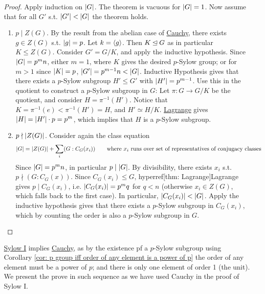 \begin{proof}
    Apply induction on $\left|G\right|$. The theorem is vacuous for $\left|G\right| = 1$. Now assume that for all $G'$ s.t. $\left|G'\right| < \left|G\right|$ the theorem holds. 

    \begin{enumerate}
        \item[\bu{Case 1.}] $p \mid Z(G)$. By the result from the abelian case of \hyperref[thm: Cauchy]{Cauchy}, there exists $g \in Z(G)$ s.t. $\left|g\right| = p$. Let $k = \left\langle g \right\rangle$. Then $K \unlhd G$ as in particular $K \leq Z(G)$. Consider $G' = G/K$, and apply the inductive hypothesis. Since $\left|G\right| = p^m n$, either $m = 1$, where $K$ gives the desired $p$-Sylow group; or for $m > 1$ since $\left|K\right| = p$, $\left|G'\right| = p^{m-1}n < \left|G\right|$. Inductive Hypothesis gives that there exists a $p$-Sylow subgroup $H' \leq G'$ with $\left|H'\right| = p^{m-1}$. Use this in the quotient to construct a $p$-Sylow subgroup in $G$: Let $\pi: G \to G/K$ be the quotient, and consider $H = \pi^{-1}(H')$. Notice that $K = \pi^{-1}(e) < \pi^{-1}(H') = H$, and $H' \simeq H/K$. \hyperref[thm: Lagrange]{Lagrange} gives $\left|H\right| = \left|H'\right| \cdot p = p^m$, which implies that $H$ is a $p$-Sylow subgroup.

        \item[\bu{Case 2.}]$p \nmid \left|Z(G)\right|$. Consider again the class equation
        \[
            \left|G\right| = \left|Z(G)\right| + \sum_{i}(G : C_G(x_i)) \qquad \text{where $x_i$ runs over set of representatives of conjugacy classes}
        \]
        Since $\left|G\right| = p^m n$, in particular $p \mid \left|G\right|$. By divisibility, there exists $x_i$ s.t. $p \nmid (G: C_G(x))$. Since $C_G(x_i) \leq G$, hyperref[thm: Lagrange]{Lagrange} gives $p \mid C_G(x_i)$, i.e. $\left|C_G(x_i)\right| = p^m q$ for $q < n$ (otherwise $x_i \in Z(G)$, which falls back to the first case). In particular, $\left|C_G(x_i)\right| < \left|G\right|$. Apply the inductive hypothesis gives that there exists a $p$-Sylow subgroup in $C_G(x_i)$, which by counting the order is also a $p$-Sylow subgroup in $G$.
    \end{enumerate}
\end{proof}

\begin{remark}
    \hyperref[thm: Sylow I]{Sylow I} implies \hyperref[thm: Cauchy]{Cauchy}, as by the existence pf a $p$-Sylow subgroup using Corollary \ref{cor: p group iff order of any element is a power of p} the order of any element must be a power of $p$; and there is only one element of order 1 (the unit). We present the prove in such sequence as we have used Cauchy in the proof of Sylow I.
\end{remark}

